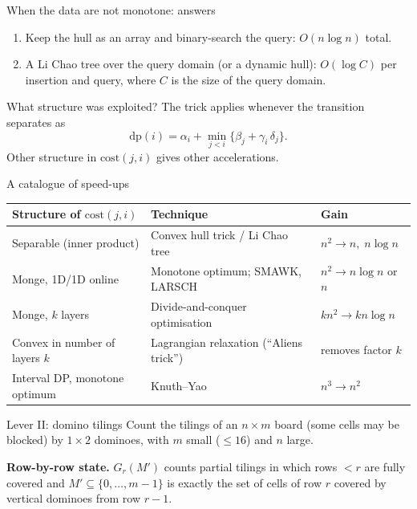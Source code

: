 \begin{frame}{When the data are not monotone: answers}
	\begin{enumerate}
		\item[(a)] Keep the hull as an array and \alert{binary-search} the query: $O(n\log n)$ total.
		\item[(b)] A \alert{Li Chao tree} over the query domain (or a dynamic hull): $O(\log C)$ per insertion and query,
		where $C$ is the size of the query domain.
	\end{enumerate}
\end{frame}

\begin{frame}{What structure was exploited?}
	The trick applies whenever the transition separates as
	\[
		\mathrm{dp}(i)=\alpha_i+\min_{j<i}\{\beta_j+\gamma_i\,\delta_j\}.
	\]
	Other structure in $\mathrm{cost}(j,i)$ gives other accelerations.
\end{frame}

\begin{frame}{A catalogue of speed-ups}
	\footnotesize
	\begin{center}
		\renewcommand{\arraystretch}{1.25}
		\begin{tabular}{@{}p{}p{}p{}@{}}
			\toprule
			Structure of $\mathrm{cost}(j,i)$ & Technique & Gain\\
			\midrule
			Separable (inner product) & Convex hull trick / Li Chao tree & $n^2\to n,\;n\log n$\\
			Monge, 1D/1D online & Monotone optimum; SMAWK, LARSCH & $n^2\to n\log n$ or $n$\\
			Monge, $k$ layers & Divide-and-conquer optimisation & $kn^2\to kn\log n$\\
			Convex in number of layers $k$ & Lagrangian relaxation (``Aliens trick'') & removes factor $k$\\
			Interval DP, monotone optimum & Knuth--Yao & $n^3\to n^2$\\
			\bottomrule
		\end{tabular}
	\end{center}
\end{frame}

\begin{frame}{Lever II: domino tilings}
	Count the tilings of an $n\times m$ board (some cells may be blocked) by $1\times2$ dominoes,
	with $m$ small ($\le 16$) and $n$ large.

	\vspace{0.5em}
	\textbf{Row-by-row state.} $G_r(M')$ counts partial tilings in which rows $<r$ are fully covered and
	$M'\subseteq\{0,\dots,m-1\}$ is exactly the set of cells of row $r$ covered by vertical dominoes from row $r-1$.
\end{frame}

